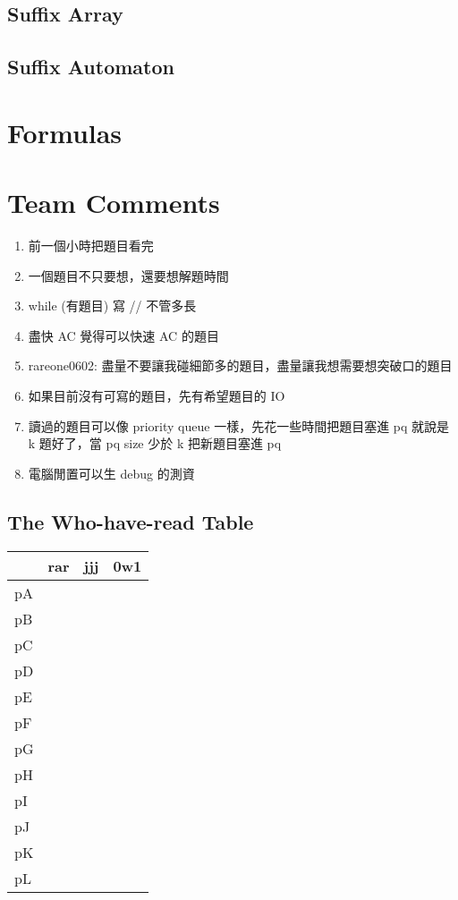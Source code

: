 \subsection{Suffix Array}

\subsection{Suffix Automaton}


\section{Formulas}


\section{Team Comments}
\begin{enumerate}
\item 前一個小時把題目看完
\item 一個題目不只要想，還要想解題時間
\item while (有題目) 寫 // 不管多長
\item 盡快 AC 覺得可以快速 AC 的題目
\item rareone0602: 盡量不要讓我碰細節多的題目，盡量讓我想需要想突破口的題目
\item 如果目前沒有可寫的題目，先有希望題目的 IO
\item 讀過的題目可以像 priority queue 一樣，先花一些時間把題目塞進 pq 就說是 k 題好了，當 pq size 少於 k 把新題目塞進 pq
\item 電腦閒置可以生 debug 的測資
\end{enumerate}

\subsection{The Who-have-read Table}
\begin{tabular}{| l | c | c | r |}
\hline
   & rar & jjj & 0w1 \\ \hline
pA &     &     &     \\ \hline
pB &     &     &     \\ \hline
pC &     &     &     \\ \hline
pD &     &     &     \\ \hline
pE &     &     &     \\ \hline
pF &     &     &     \\ \hline
pG &     &     &     \\ \hline
pH &     &     &     \\ \hline
pI &     &     &     \\ \hline
pJ &     &     &     \\ \hline
pK &     &     &     \\ \hline
pL &     &     &     \\ \hline
\end{tabular}